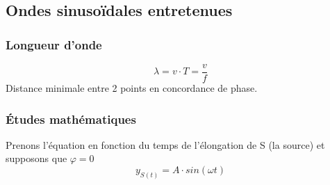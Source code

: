 \documentclass[11pt]{article}
\begin{document}
\subsection{Ondes sinusoïdales entretenues}
\subsubsection{Longueur d'onde}
\begin{equation}
    \lambda = v \cdot T = \dfrac{v}{f}
\end{equation}
Distance minimale entre 2 points en concordance de phase.
\subsubsection{Études mathématiques}
Prenons l'équation en fonction du temps de l'élongation de S (la source) et supposons que $\varphi = 0$
\begin{equation}
    y_{S(t)}= A \cdot sin(\omega t)
\end{equation}
\end{document}
